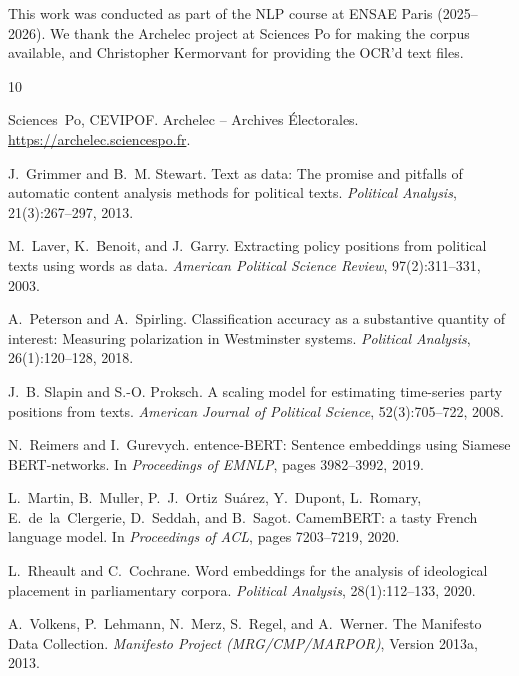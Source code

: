 \documentclass{article}
\begin{document}
\begin{ack}
This work was conducted as part of the NLP course at ENSAE Paris (2025--2026). We thank the Archelec project at Sciences Po for making the corpus available, and Christopher Kermorvant for providing the OCR'd text files.
\end{ack}



\begin{thebibliography}{10}

Sciences~Po, CEVIPOF.
\newblock Archelec -- Archives \'{E}lectorales.
\newblock \url{https://archelec.sciencespo.fr}.


J.~Grimmer and B.~M. Stewart.
\newblock Text as data: The promise and pitfalls of automatic content analysis methods for political texts.
\newblock \emph{Political Analysis}, 21(3):267--297, 2013.

M.~Laver, K.~Benoit, and J.~Garry.
\newblock Extracting policy positions from political texts using words as data.
\newblock \emph{American Political Science Review}, 97(2):311--331, 2003.

A.~Peterson and A.~Spirling.
\newblock Classification accuracy as a substantive quantity of interest: Measuring polarization in {W}estminster systems.
\newblock \emph{Political Analysis}, 26(1):120--128, 2018.

J.~B. Slapin and S.-O. Proksch.
\newblock A scaling model for estimating time-series party positions from texts.
\newblock \emph{American Journal of Political Science}, 52(3):705--722, 2008.

N.~Reimers and I.~Gurevych.
entence-{BERT}: Sentence embeddings using {S}iamese {BERT}-networks.
\newblock In \emph{Proceedings of EMNLP}, pages 3982--3992, 2019.

L.~Martin, B.~Muller, P.~J.~Ortiz~Su\'{a}rez, Y.~Dupont, L.~Romary, E.~de~la~Clergerie, D.~Seddah, and B.~Sagot.
\newblock CamemBERT: a tasty French language model.
\newblock In \emph{Proceedings of ACL}, pages 7203--7219, 2020.

L.~Rheault and C.~Cochrane.
\newblock Word embeddings for the analysis of ideological placement in parliamentary corpora.
\newblock \emph{Political Analysis}, 28(1):112--133, 2020.

A.~Volkens, P.~Lehmann, N.~Merz, S.~Regel, and A.~Werner.
\newblock The Manifesto Data Collection.
\newblock \emph{Manifesto Project (MRG/CMP/MARPOR)}, Version 2013a, 2013.

\end{thebibliography}
\end{document}
